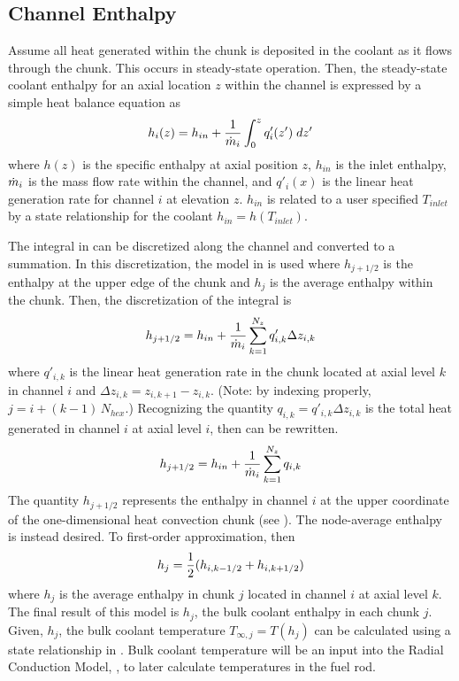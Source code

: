   \subsection{Channel Enthalpy}
    Assume all heat generated within the chunk is deposited in the coolant as it
    flows through the chunk. This occurs in steady-state operation. Then, the 
    steady-state coolant enthalpy for an axial location $z$ within the channel
    is expressed by a simple heat balance equation as
    \begin{equation}
      \label{eq:continuous_heat_balance}
      h_i(z) = h_{in} + \frac{1}{\dot{m}_i} \int_0^z q'_i(z') \; dz'
    \end{equation}
    where $h(z)$ is the specific enthalpy at axial position $z$, $h_{in}$ is the
    inlet enthalpy, $\dot{m}_i$ is the mass flow rate within the channel, and 
    $q'_i(x)$ is the linear heat generation rate for channel $i$ at elevation 
    $z$. $h_{in}$ is related to a user specified $T_{inlet}$ by a state 
    relationship for the coolant $h_{in} = h(T_{inlet})$.  

    The integral in  can be discretized along
    the channel and converted to a summation. In this discretization, the model
    in  is used where $h_{j+1/2}$ is the enthalpy at the
    upper edge of the chunk and $h_j$ is the average enthalpy within the chunk.
    Then, the discretization of the integral 
    is 
    \begin{equation}
      \label{eq:heat_balance}
      h_{j+1/2} = 
        h_{in} + \frac{1}{\dot{m}_i} \sum_{k=1}^{N_z} q'_{i,k} \Delta z_{i,k}
    \end{equation}
    where $q'_{i,k}$ is the linear heat generation rate in the chunk located at 
    axial level $k$ in channel $i$ and $\Delta z_{i,k} = z_{i,k+1} - z_{i,k}$. 
    (Note: by indexing properly, $j = i + (k-1) \, N_{hex}$.)
    Recognizing the quantity $q_{i,k} = q'_{i,k} \Delta z_{i,k}$
    is the total heat generated in channel $i$ at axial level $i$, then 
     can be rewritten.
    \begin{equation}
      h_{j+1/2} = h_{in} + \frac{1}{\dot{m}_i} \sum_{k=1}^{N_z} q_{i,k}
    \end{equation}
    The quantity $h_{j+1/2}$ represents the enthalpy in channel $i$ at the upper 
    coordinate of the one-dimensional heat convection chunk (see
    ). The node-average 
    enthalpy is instead desired. To first-order approximation, then
    \begin{equation}
      h_j = \frac{1}{2} (h_{i,k-1/2}+h_{i,k+1/2})
    \end{equation}
    where $h_j$ is the average enthalpy in chunk $j$ located in channel $i$ at
    axial level $k$.
    The final result of this model is $h_j$, the bulk coolant enthalpy in each
    chunk $j$. Given, $h_j$, the bulk coolant temperature 
    $T_{\infty,j} = T(h_j)$ can be calculated using a state relationship in
    \cite{sodiumProp}. Bulk coolant temperature will be an input into the Radial
    Conduction Model, , to later calculate
    temperatures in the fuel rod.
  
